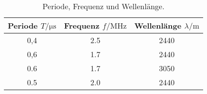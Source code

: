 \begin{table}[H]
  \centering
  \caption{Periode, Frequenz und Wellenlänge.}
  \label{tab:ImpLaufzeit}
  \begin{tabular}{S[table-format=1.1] S[table-format=1.1] S[table-format=4.0] }
  \toprule
   {Periode $T / \si{\micro\second}$} & {Frequenz $f/ \si{\mega\Hz}$} & {Wellenlänge $\lambda /\si{\meter}$}\\
  ,4  & 2.5 & 2440  \\
    0,6  & 1.7 & 2440  \\
    0.6  & 1.7 & 3050  \\
    0.5  & 2.0 & 2440  \\
  \bottomrule
  \end{tabular}
\end{table}



